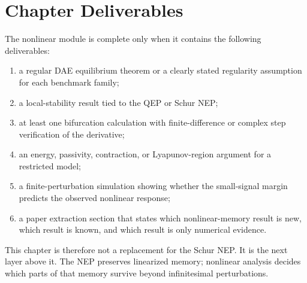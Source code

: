 \section{Chapter Deliverables}

The nonlinear module is complete only when it contains the following
deliverables:
\begin{enumerate}
\item a regular DAE equilibrium theorem or a clearly stated regularity
assumption for each benchmark family;
\item a local-stability result tied to the QEP or Schur NEP;
\item at least one bifurcation calculation with finite-difference or complex
step verification of the derivative;
\item an energy, passivity, contraction, or Lyapunov-region argument for a
restricted model;
\item a finite-perturbation simulation showing whether the small-signal margin
predicts the observed nonlinear response;
\item a paper extraction section that states which nonlinear-memory result is
new, which result is known, and which result is only numerical evidence.
\end{enumerate}

This chapter is therefore not a replacement for the Schur NEP. It is the next
layer above it. The NEP preserves linearized memory; nonlinear analysis decides
which parts of that memory survive beyond infinitesimal perturbations.
